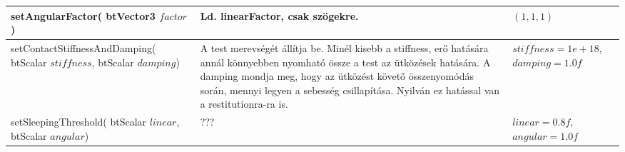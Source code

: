 \documentclass[12p,a4paper,notitlepage]{scrartcl}
\begin{document}
\begin{tabular}{|p{65mm}|p{85mm}|p{20mm}|}
\hline
setAngularFactor(\newline
btVector3 $factor$) & Ld. linearFactor, csak szögekre. & $(1,1,1)$ \\
\hline
setContactStiffnessAndDamping(\newline
btScalar $stiffness$, \newline
btScalar $damping$) &
A test merevségét állítja be. Minél kisebb a stiffness, erő hatására annál könnyebben nyomható össze a test az ütközések hatására. A damping mondja meg, hogy az ütközést követő összenyomódás során, mennyi legyen a sebesség csillapítása.
Nyilván ez hatással van a restitutionra-ra is. & $stiffness = 1e+18$, $damping = 1.0f$ \\
\hline
setSleepingThreshold(\newline
btScalar $linear$, \newline
btScalar $angular$) &
??? & $linear = 0.8f$, $angular = 1.0f$ \\
\hline






\end{tabular}
\end{document}
